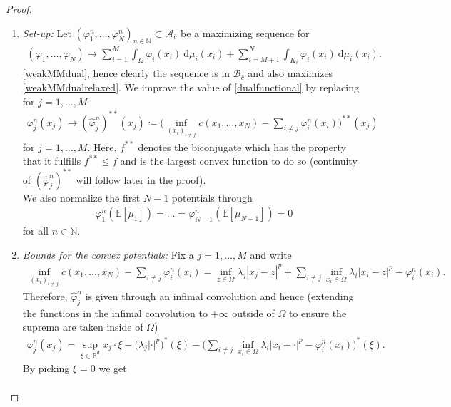 \documentclass[10pt,a4paper]{amsart}
\newcommand{\RR}{\mathbb{R}}
\newcommand{\NN}{\mathbb{N}}
\newcommand{\EE}{\mathbb{E}}
\newcommand{\dd}{\mathrm{d}}
\begin{document}
\begin{proof}

	\setdefaultleftmargin{0pt}{}{}{}{}{}
	\begin{enumerate}
	\item \textit{Set-up:}
	Let $(\varphi_1^n,\dots,\varphi_N^n)_{n\in\NN}\subset\mathcal A_{\bar c}$ be a maximizing sequence for
	\begin{gather}\label{dualfunctional}
		(\varphi_1,\dots,\varphi_N)\mapsto \sum_{i=1}^M\int_\Omega\varphi_i(x_i)\ \dd\mu_i(x_i)+\sum_{i=M+1}^N\int_{K_i}\varphi_i(x_i)\ \dd\mu_i(x_i).
	\end{gather}
	\eqref{weakMMdual}, hence clearly the sequence is in $\mathcal B_{\bar c}$ and also maximizes \eqref{weakMMdualrelaxed}.
	We improve the value of \eqref{dualfunctional} by replacing for $j=1,\dots,M$
	\begin{gather*}
		\varphi_j^n(x_j)\rightarrow (\hat\varphi_j^{n})^{**}(x_j)\coloneqq\Big(\inf_{(x_i)_{i\neq j}}\bar c(x_1,\dots,x_N)-\sum_{i\neq j}\varphi_i^n(x_i)\Big)^{**}(x_j)
	\end{gather*}
	for $j=1,\dots,M$. Here, $f^{**}$ denotes the biconjugate which has the property that it fulfills $f^{**}\leq f$ and is the largest convex function to do so (continuity of $(\hat\varphi_j^n)^{**}$ will follow later in the proof).\\
	We also normalize the first $N-1$ potentials through
	\begin{gather*}
		\varphi_1^n(\EE[\mu_1])=\dots=\varphi_{N-1}^n(\EE[\mu_{N-1}])=0
	\end{gather*}
	for all $n\in\NN$.
	\item \textit{Bounds for the convex potentials:}
	Fix a $j=1,\dots,M$ and write
	\begin{gather*}
		\inf_{(x_i)_{i\neq j}}\bar c(x_1,\dots,x_N)-\sum_{i\neq j}\varphi_i^n(x_i)=\inf_{z\in\Omega}\lambda_j|x_j-z|^p+\sum_{i\neq j}\inf_{x_i\in\Omega}\lambda_i|x_i-z|^p-\varphi_i^n(x_i).
	\end{gather*}
	Therefore, $\hat\varphi_j^n$ is given through an infimal convolution and hence (extending the functions in the infimal convolution to $+\infty$ outside of $\Omega$ to ensure the suprema are taken inside of $\Omega$)
	\begin{gather*}
		\varphi_j^n(x_j)=\sup_{\xi\in\RR^d}x_j\cdot\xi-\big(\lambda_j|\cdot|^p\big)^*(\xi)-\Big(\sum_{i\neq j}\inf_{x_i\in\Omega}\lambda_i|x_i-\cdot|^p-\varphi_i^n(x_i)\Big)^*(\xi).
	\end{gather*}
	By picking $\xi=0$ we get
	\begin{align*}

\end{align*}
\end{enumerate}
\end{proof}
\end{document}
